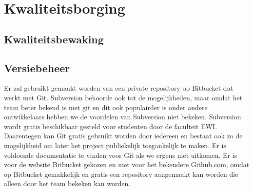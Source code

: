 \section{Kwaliteitsborging}
\subsection{Kwaliteitsbewaking}
\subsection{Versiebeheer}
Er zal gebruikt gemaakt worden van een private repository op Bitbucket dat werkt met Git. Subversion behoorde ook tot de mogelijkheden, maar omdat het team beter bekend is met git en dit ook populairder is onder andere ontwikkelaars hebben we de voordelen van Subversion niet bekeken. Subversion wordt gratis beschikbaar gesteld voor studenten door de faculteit EWI. Daarentegen kan Git gratis gebruikt worden door iedereen en bestaat ook zo de mogelijkheid om later het project publiekelijk toegankelijk te maken. Er is voldoende documentatie te vinden voor Git als we ergens niet uitkomen. Er is voor de website Bitbucket gekozen en niet voor het bekendere Github.com, omdat op Bitbucket gemakkelijk en gratis een repository aangemaakt kan worden die alleen door het team bekeken kan worden. 
